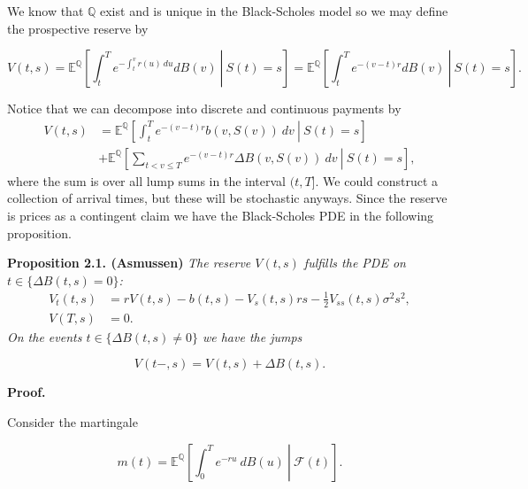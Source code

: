 \documentclass[a4paper,10pt,openany]{book}
\begin{document}
We know that \(\mathbb Q\) exist and is unique in the Black-Scholes model so we may define the prospective reserve by

\[
V(t,s)=\mathbb E^{\mathbb Q}\left[\left.\int_t^Te^{-\int_t^vr(u)\ du}dB(v)\ \right\vert\ S(t)=s\right]=\mathbb E^{\mathbb Q}\left[\left.\int_t^Te^{-(v-t)r}dB(v)\ \right\vert\ S(t)=s\right].
\]

Notice that we can decompose into discrete and continuous payments by
\begin{align*}
V(t,s)&=\mathbb E^{\mathbb Q}\left[\left.\int_t^Te^{-(v-t)r}b(v,S(v))\ dv\ \right\vert\ S(t)=s\right]\\
&+\mathbb E^{\mathbb Q}\left[\left.\sum_{t< v\le T}e^{-(v-t)r}\Delta B(v,S(v))\ dv\ \right\vert\ S(t)=s\right],
\end{align*}
where the sum is over all lump sums in the interval \((t,T]\). We could construct a collection of arrival times, but these will be stochastic anyways. Since the reserve is prices as a contingent claim we have the Black-Scholes PDE in the following proposition.

\textbf{Proposition 2.1. (Asmussen)} \emph{The reserve \(V(t,s)\) fulfills the PDE on \(t\in\{\Delta B(t,s)=0\}\):}
\begin{align*}
V_t(t,s)&=rV(t,s)-b(t,s)-V_s(t,s)rs-\frac{1}{2}V_{ss}(t,s)\sigma^2s^2,\\
V(T,s)&=0.
\end{align*}
\emph{On the events \(t\in \{\Delta B(t,s)\ne 0\}\) we have the jumps}

\[
V(t-,s)=V(t,s)+\Delta B(t,s).
\]

\textbf{Proof.}

Consider the martingale

\[
m(t)=\mathbb E^{\mathbb Q}\left[\left. \int_0^Te^{-ru}\ dB(u)\ \right\vert\ \mathcal F(t)\right].
\]
\end{document}
